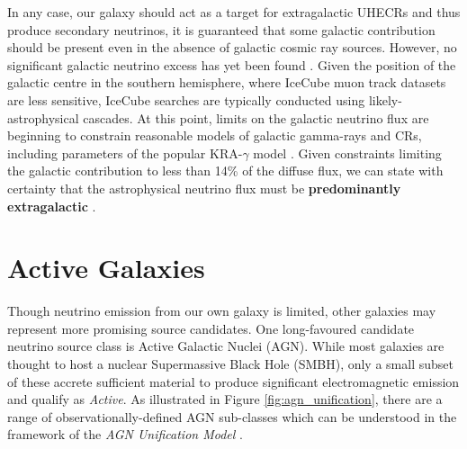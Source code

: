 In any case, our galaxy should act as a target for extragalactic UHECRs and thus produce secondary neutrinos, it is guaranteed that some galactic contribution should be present even in the absence of galactic cosmic ray sources. However, no significant galactic neutrino excess has yet been found . Given the position of the galactic centre in the southern hemisphere, where IceCube muon track datasets are less sensitive, IceCube searches are typically conducted using likely-astrophysical cascades. At this point, limits on the galactic neutrino flux are beginning to constrain reasonable models of galactic gamma-rays and CRs, including parameters of the popular KRA-$\gamma$ model . Given constraints limiting the galactic contribution to less than 14\% of the diffuse flux, we can state with certainty that the astrophysical neutrino flux must be \textbf{predominantly extragalactic} \cite{ic_17_galactic}. 
%

\section{Active Galaxies}
\label{sec:agn}

Though neutrino emission from our own galaxy is limited, other galaxies may represent more promising source candidates. One long-favoured candidate neutrino source class is Active Galactic Nuclei (AGN). While most galaxies are thought to host a nuclear Supermassive Black Hole (SMBH), only a small subset of these accrete sufficient material to produce significant electromagnetic emission and qualify as \emph{Active}. As illustrated in Figure \ref{fig:agn_unification}, there are a range of observationally-defined AGN sub-classes which can be understood in the framework of the \emph{AGN Unification Model} . 

